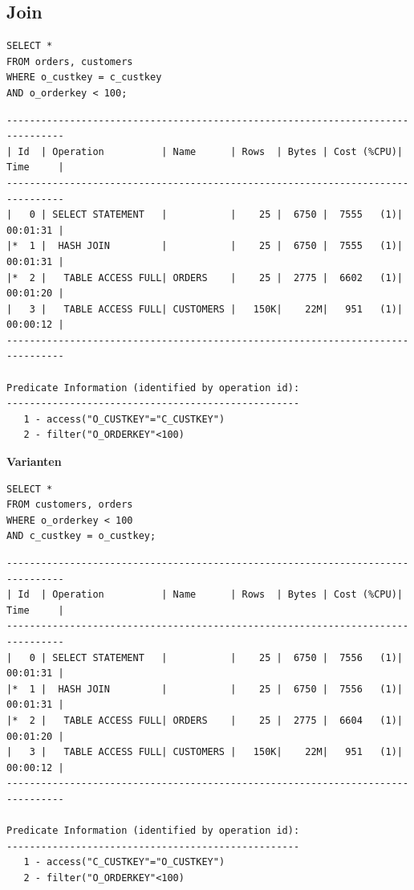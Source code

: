 \documentclass[10pt]{article}
\begin{document}
\subsection{Join}
\begin{lstlisting}[style=sql]
SELECT *
FROM orders, customers
WHERE o_custkey = c_custkey
AND o_orderkey < 100;
\end{lstlisting}
\begin{lstlisting}[style=queryexecutionplan]
--------------------------------------------------------------------------------
| Id  | Operation          | Name      | Rows  | Bytes | Cost (%CPU)| Time     |
--------------------------------------------------------------------------------
|   0 | SELECT STATEMENT   |           |    25 |  6750 |  7555   (1)| 00:01:31 |
|*  1 |  HASH JOIN         |           |    25 |  6750 |  7555   (1)| 00:01:31 |
|*  2 |   TABLE ACCESS FULL| ORDERS    |    25 |  2775 |  6602   (1)| 00:01:20 |
|   3 |   TABLE ACCESS FULL| CUSTOMERS |   150K|    22M|   951   (1)| 00:00:12 |
--------------------------------------------------------------------------------

Predicate Information (identified by operation id):
---------------------------------------------------                                                                 
   1 - access("O_CUSTKEY"="C_CUSTKEY")
   2 - filter("O_ORDERKEY"<100)
\end{lstlisting}  
\textbf{Varianten}
\begin{lstlisting}[style=sql]
SELECT *
FROM customers, orders
WHERE o_orderkey < 100
AND c_custkey = o_custkey;
\end{lstlisting}
\begin{lstlisting}[style=queryexecutionplan]
--------------------------------------------------------------------------------
| Id  | Operation          | Name      | Rows  | Bytes | Cost (%CPU)| Time     |
--------------------------------------------------------------------------------
|   0 | SELECT STATEMENT   |           |    25 |  6750 |  7556   (1)| 00:01:31 |
|*  1 |  HASH JOIN         |           |    25 |  6750 |  7556   (1)| 00:01:31 |
|*  2 |   TABLE ACCESS FULL| ORDERS    |    25 |  2775 |  6604   (1)| 00:01:20 |
|   3 |   TABLE ACCESS FULL| CUSTOMERS |   150K|    22M|   951   (1)| 00:00:12 |
--------------------------------------------------------------------------------

Predicate Information (identified by operation id):
---------------------------------------------------
   1 - access("C_CUSTKEY"="O_CUSTKEY")
   2 - filter("O_ORDERKEY"<100)
\end{lstlisting}
\end{document}
